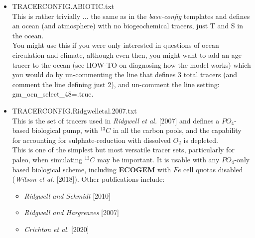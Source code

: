 \begin{itemize}[noitemsep]

\vspace{1mm}
\item \textsf{\small TRACERCONFIG.ABIOTIC.txt}
\vspace{1mm}
\\This is rather trivially ... the same as in the \textit{base-config} templates and defines an ocean (and atmosphere) with no biogeochemical tracers, just T and S in the ocean.
\\You might use this if you were only interested in questions of ocean circulation and climate, although even then, you might want to add an age tracer to the ocean (see HOW-TO on diagnosing how the model works) which you would do by un-commenting the line that defines 3 total tracers (and comment the line defining just 2), and un-comment the line setting: \textsf{\footnotesize gm\_ocn\_select\_48=.true.}

\vspace{2mm}
\item \textsf{\small TRACERCONFIG.Ridgwelletal.2007.txt}
\vspace{1mm}
\\This is the set of tracers used in \textit{Ridgwell et al.} [2007] and defines a \(PO_{4}\)-based biological pump, with \(^{13}C\) in all the carbon pools, and the capability for accounting for sulphate-reduction with dissolved \(O_{2}\) is depleted.
\\This is one of the simplest but most versatile tracer sets, particularly for paleo, when simulating \(^{13}C\) may be important. It is usable with any \(PO_{4}\)-only based biological scheme, including \textbf{ECOGEM} with \(Fe\) cell quotas disabled (\textit{Wilson et al.} [2018]). Other publications include:
\vspace{1mm}
\begin{itemize}[noitemsep]
\item \textit{Ridgwell and Schmidt} [2010]
\item \textit{Ridgwell and Hargreaves} [2007]
\item \textit{Crichton et al.} [2020]
\end{itemize}


\end{itemize}
